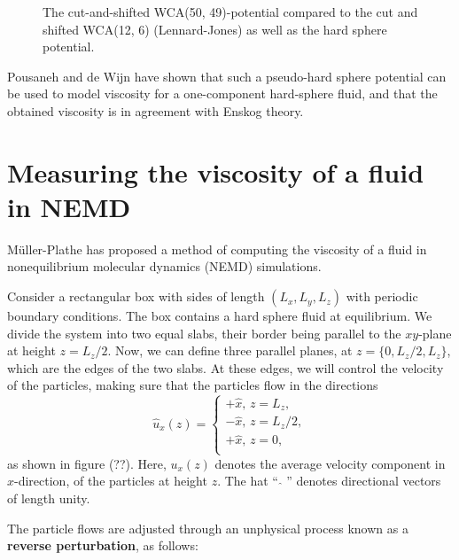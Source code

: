 \begin{figure}[htbp]
    
    \caption{The cut-and-shifted WCA(50, 49)-potential 
            compared to the cut and shifted WCA(12, 6) 
            (Lennard-Jones) as well as the hard sphere 
            potential.
    }
\end{figure}

Pousaneh and de Wijn \cite{ref:pousaneh:shear_viscosity} 
have shown that such a pseudo-hard sphere potential 
can be used to model viscosity for a one-component hard-sphere fluid, 
and that the obtained viscosity is in agreement with Enskog theory.


\section{Measuring the viscosity of a fluid in NEMD}
Müller-Plathe \cite{ref:mullerplathe:reversing_the_perturbation} 
has proposed a method of computing the viscosity of a fluid in 
nonequilibrium molecular dynamics (NEMD) simulations.

Consider a rectangular box with sides of length \((L_x, L_y, L_z)\) 
with periodic boundary conditions.
The box contains a hard sphere fluid at equilibrium.
We divide the system into two equal slabs, their border 
being parallel to the $xy$-plane at height \(z = L_z/2\).
Now, we can define three parallel planes, at 
\(z = \{0, L_z/2, L_z\}\), which are the edges of the two slabs.
At these edges, we will control the velocity of the particles, 
making sure that the particles flow in the directions
\[
    \label{eq:velocity_directions}
    \hat{u}_x(z) =
    \begin{cases}
        +\hat{x}, \,z = L_z,    \\
        -\hat{x}, \,z = L_z/2,  \\
        +\hat{x}, \,z = 0,    \\
    \end{cases}
\]
as shown in figure (??). %
Here, \(u_x(z)\) denotes the average velocity component 
in $x$-direction, of the particles at height $z$.
The hat ``\(\,\, \hat{ } \,\,\)'' denotes 
directional vectors of length unity.

The particle flows are adjusted through an unphysical process known as a 
\textbf{reverse perturbation}\cite{ref:mullerplathe:reversing_the_perturbation},
as follows:

